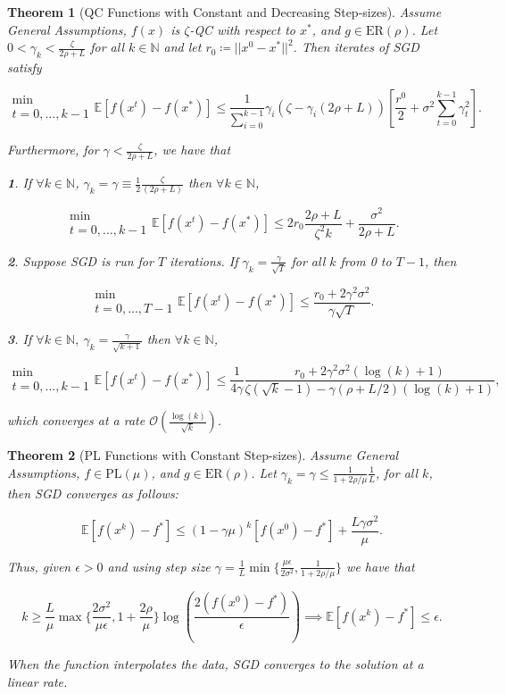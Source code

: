 \documentclass{article}
\newtheorem{theorem}{Theorem}[section]
\begin{document}
\begin{theorem}[QC Functions with Constant and Decreasing Step-sizes]
	Assume \textit{General Assumptions}, $f(x)$ is $\zeta$-QC with respect to $x^*$, and $g\in\text{ER}(\rho)$. Let $0 < \gamma_k < \frac{\zeta}{2\rho + L}$ for all $k\in\mathbb{N}$ and let $r_0\coloneqq ||x^0 - x^*||^2$.
	Then iterates of SGD satisfy

	\[
		\substack{\min \\ t=0,\dots, k-1}\mathbb{E}\left[f(x^t) - f(x^*)\right] \leq \frac{1}{\sum_{i=0}^{k-1}}\gamma_i (\zeta - \gamma_i (2\rho + L)) \left[\frac{r^0}{2} + \sigma^2 \sum^{k-1}_{t=0}\gamma_t^2\right].
	\]

	Furthermore, for $\gamma < \frac{\zeta}{2\rho + L}$, we have that

	\textbf{1}. If $\forall k\in\mathbb{N}$, $\gamma_k = \gamma \equiv \frac{1}{2}\frac{\zeta}{(2\rho + L)}$ then $\forall k\in\mathbb{N}$,

	\[
		\substack{\min \\ t=0,\dots, k-1}\mathbb{E}[f(x^t) - f(x^*)]\leq 2r_0 \frac{2\rho + L}{\zeta^2 k} + \frac{\sigma^2}{2\rho + L}.
	\]

	\textbf{2}. Suppose SGD is run for $T$ iterations. If $\gamma_k = \frac{\gamma}{\sqrt{T}}$ for all $k$ from 0 to $T-1$, then

	\[
		\substack{\min \\ t=0,\dots, T-1} \mathbb{E}[f(x^t) - f(x^*)] \leq \frac{r_0 + 2\gamma^2 \sigma^2}{\gamma\sqrt{T}}.
	\]

	\textbf{3}. If $\forall k\in\mathbb{N},\ \gamma_k = \frac{\gamma}{\sqrt{k+1}}$ then $\forall k \in\mathbb{N}$,

	\[
		\substack{\min \\ t=0,\dots, k-1} \mathbb{E}[f(x^t) - f(x^*)] \leq \frac{1}{4\gamma} \frac{r_0 + 2\gamma^2 \sigma^2 (\log{(k)} + 1)}{\zeta (\sqrt{k} - 1) - \gamma(\rho + L/2)(\log{(k)} + 1)},
	\]

	which converges at a rate $\mathcal{O}\left(\frac{\log(k)}{\sqrt{k}}\right)$.
\end{theorem}

\begin{theorem}[PL Functions with Constant Step-sizes]
	Assume \textit{General Assumptions}, $f\in\text{PL}(\mu)$, and $g\in\text{ER}(\rho)$. Let $\gamma_k = \gamma\leq \frac{1}{1+2\rho/\mu}\frac{1}{L}$, for all $k$, then SGD converges as follows:

	\[
		\mathbb{E}[f(x^k) - f^*] \leq (1-\gamma\mu)^k[f(x^0) - f^*] + \frac{L\gamma\sigma^2}{\mu}.
	\]

	Thus, given $\epsilon > 0$ and using step size $\gamma = \frac{1}{L}\min\{\frac{\mu\epsilon}{2\sigma^2}, \frac{1}{1+2\rho/\mu}\}$ we have that

	\[
		k\geq \frac{L}{\mu}\max\{\frac{2\sigma^2}{\mu\epsilon}, 1+\frac{2\rho}{\mu}\}\log\left(\frac{2(f(x^0) - f^*)}{\epsilon}\right) \implies \mathbb{E}[f(x^k) - f^*]\leq \epsilon.
	\]

	When the function interpolates the data, SGD converges to the solution at a linear rate.
\end{theorem}
\end{document}
